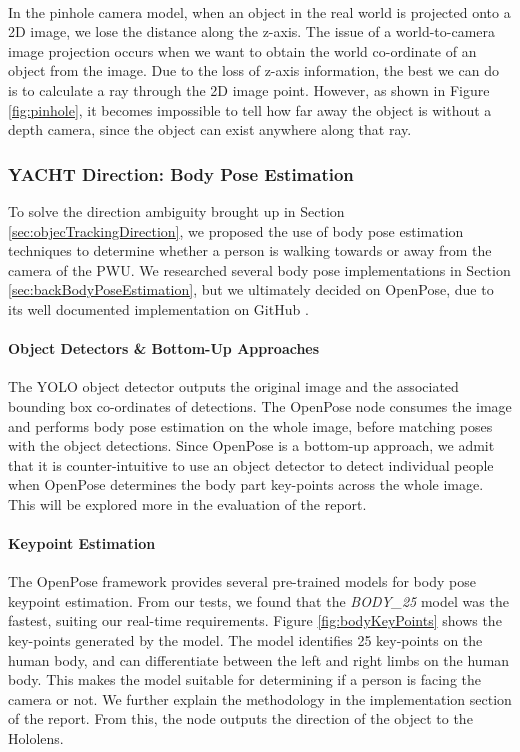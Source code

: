 \paragraph{} In the pinhole camera model, when an object in the real world is projected onto a 2D image, we lose the distance along the z-axis. The issue of a world-to-camera image projection occurs when we want to obtain the world co-ordinate of an object from the image. Due to the loss of z-axis information, the best we can do is to calculate a ray through the 2D image point. However, as shown in Figure \ref{fig:pinhole}, it becomes impossible to tell how far away the object is without a depth camera, since the object can exist anywhere along that ray.

\subsubsection{YACHT Direction: Body Pose Estimation} \label{des:YACHTBody}
To solve the direction ambiguity brought up in Section \ref{sec:objecTrackingDirection}, we proposed the use of body pose estimation techniques to determine whether a person is walking towards or away from the camera of the PWU. We researched several body pose implementations in Section \ref{sec:backBodyPoseEstimation}, but we ultimately decided on OpenPose, due to its well documented implementation on GitHub \cite{Cao2017}.

\paragraph{Object Detectors \& Bottom-Up Approaches} The YOLO object detector outputs the original image and the associated bounding box co-ordinates of detections. The OpenPose node consumes the image and performs body pose estimation on the whole image, before matching poses with the object detections. Since OpenPose is a bottom-up approach, we admit that it is counter-intuitive to use an object detector to detect individual people when OpenPose determines the body part key-points across the whole image. This will be explored more in the evaluation of the report.

\paragraph{Keypoint Estimation} \label{des:body_25}
The OpenPose framework provides several pre-trained models for body pose keypoint estimation. From our tests, we found that the \textit{BODY\_25} model was the fastest, suiting our real-time requirements. Figure \ref{fig:bodyKeyPoints} shows the key-points generated by the model. The model identifies 25 key-points on the human body, and can differentiate between the left and right limbs on the human body. This makes the model suitable for determining if a person is facing the camera or not. We further explain the methodology in the implementation section of the report. From this, the node outputs the direction of the object to the Hololens.

